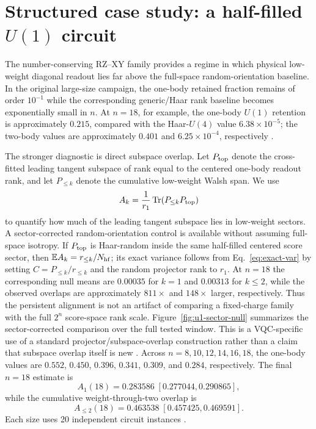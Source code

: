 \documentclass[aps,pra,reprint,superscriptaddress,nofootinbib,longbibliography]{revtex4-2}
\newcommand{\Tr}{\operatorname{Tr}}
\begin{document}
\section{Structured case study: a half-filled $U(1)$ circuit}

The number-conserving RZ--XY family provides a regime in which physical low-weight diagonal readout lies far above the full-space random-orientation baseline. In the original large-size campaign, the one-body retained fraction remains of order $10^{-1}$ while the corresponding generic/Haar rank baseline becomes exponentially small in $n$. At $n=18$, for example, the one-body $U(1)$ retention is approximately $0.215$, compared with the Haar-$U(4)$ value $6.38\times10^{-5}$; the two-body values are approximately $0.401$ and $6.25\times10^{-4}$, respectively \cite{AitHaddou2026MeasurementAccessible}.

The stronger diagnostic is direct subspace overlap. Let $P_{\rm top}$ denote the cross-fitted leading tangent subspace of rank equal to the centered one-body readout rank, and let $P_{\le k}$ denote the cumulative low-weight Walsh span. We use
\begin{equation}
A_k=\frac{1}{r_1}\Tr(P_{\le k}P_{\rm top})
\label{eq:Ak}
\end{equation}
to quantify how much of the leading tangent subspace lies in low-weight sectors. A sector-corrected random-orientation control is available without assuming full-space isotropy. If $P_{\rm top}$ is Haar-random inside the same half-filled centered score sector, then $\mathbb E A_k=r_{\le k}/N_{\rm hf}$; its exact variance follows from Eq.~\eqref{eq:exact-var} by setting $C=P_{\le k}/r_{\le k}$ and the random projector rank to $r_1$. At $n=18$ the corresponding null means are $0.00035$ for $k=1$ and $0.00313$ for $k\le2$, while the observed overlaps are approximately $811\times$ and $148\times$ larger, respectively. Thus the persistent alignment is not an artifact of comparing a fixed-charge family with the full $2^n$ score-space rank scale. Figure~\ref{fig:u1-sector-null} summarizes the sector-corrected comparison over the full tested window. This is a VQC-specific use of a standard projector/subspace-overlap construction rather than a claim that subspace overlap itself is new \cite{Fernandez2025}. Across $n=8,10,12,14,16,18$, the one-body values are $0.552$, $0.450$, $0.396$, $0.341$, $0.309$, and $0.284$, respectively. The final $n=18$ estimate is
\begin{equation}
A_1(18)=0.283586\;[0.277044,0.290865],
\end{equation}
while the cumulative weight-through-two overlap is
\begin{equation}
A_{\le2}(18)=0.463538\;[0.457425,0.469591].
\end{equation}
Each size uses 20 independent circuit instances \cite{AitHaddou2026MeasurementAccessible}.
\end{document}
